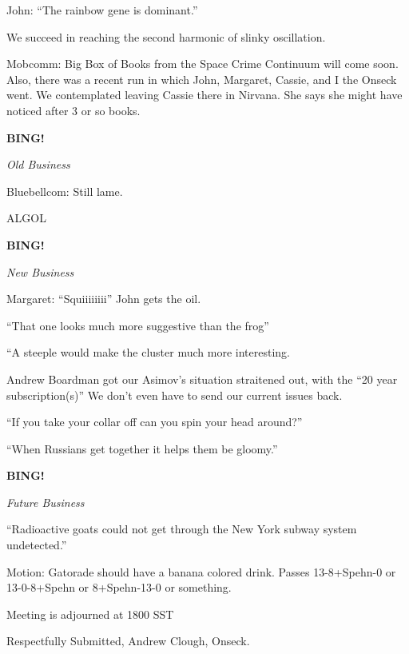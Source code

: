 \documentclass[12pt]{article}
\newcommand{\bing}{{\bf BING!} }
\newcommand{\goto}[1]{\bing \vskip 12pt \centerline{{\em{#1}}}}
\begin{document}
John:  ``The rainbow gene is dominant.''

We succeed in reaching the second harmonic of slinky oscillation.

Mobcomm:  Big Box of Books from the Space Crime Continuum will come soon.  Also, there was a recent run in which John, Margaret, Cassie, and I the Onseck went.  We contemplated leaving Cassie there in Nirvana.  She says she might have noticed after 3 or so books.

\goto{Old Business}

Bluebellcom:  Still lame.

ALGOL

\goto{New Business}

Margaret:  ``Squiiiiiiii''  John gets the oil.

``That one looks much more suggestive than the frog''

``A steeple would make the cluster much more interesting.

Andrew Boardman got our Asimov's situation straitened out, with the ``20 year subscription(s)''  We don't even have to send our current issues back.

``If you take your collar off can you spin your head around?''

``When Russians get together it helps them be gloomy.''

\goto{Future Business}

``Radioactive goats could not get through the New York subway system undetected.''

Motion:  Gatorade should have a banana colored drink.  Passes 13-8+Spehn-0 or 13-0-8+Spehn or 8+Spehn-13-0 or something.

Meeting is adjourned at 1800 SST

\vspace{18pt}

\begin{center}
Respectfully Submitted,
Andrew Clough, Onseck.
\end{center}
\end{document}
